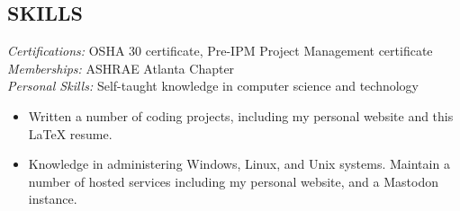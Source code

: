 \documentclass[margin]{res}
\begin{document}
\begin{resume}
\section{SKILLS}
    {\sl Certifications:} OSHA 30 certificate, Pre-IPM Project Management certificate \\
    {\sl Memberships:} ASHRAE Atlanta Chapter \\
    {\sl Personal Skills:} Self-taught knowledge in computer science and technology
    \begin{itemize} \itemsep -2pt
    \item Written a number of coding projects, including my personal website and this \LaTeX{} resume. 
    \item Knowledge in administering Windows, Linux, and Unix systems. Maintain a number of hosted services including my personal website, and a Mastodon instance.
    \end{itemize}

\end{resume}
\end{document}
